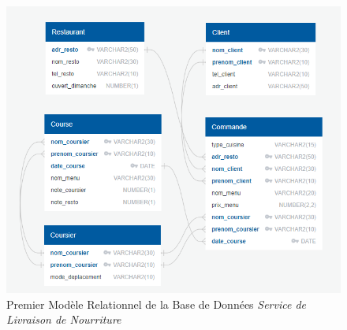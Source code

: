 \documentclass[french]{article}
\begin{document}
            \begin{figure}[ht] %
                \centering
                \includegraphics[scale = 0.7]{Image/modele_relationnel_1.png}
                \caption{Premier Modèle Relationnel de la Base de Données \emph{Service de Livraison de Nourriture}}
                \label{image_modele_relationnel_1}
            \end{figure}
            \newpage
\end{document}

